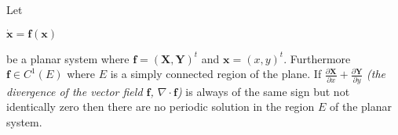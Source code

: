 \documentclass[12pt]{article}
\begin{document}
Let
\begin{center}
$\dot{\textbf{x}} = \textbf{f}(\textbf{x})$
\end{center}
be a planar system where $\textbf{f} = (\textbf{X},\textbf{Y})^t$ and $\textbf{x} = (x,y)^t$.  Furthermore $\textbf{f} \in C^1(E)$ where $E$ is a simply connected region of the plane. If $\frac{\partial \textbf{X}}{\partial x}+\frac{\partial \textbf{Y}}{\partial y}$ \textit{(the divergence of the vector field $\textbf{f}$, $\nabla \cdot \textbf{f}$)} is always of the same sign but not identically zero then there are no periodic solution in the region $E$ of the planar system.
\end{document}
